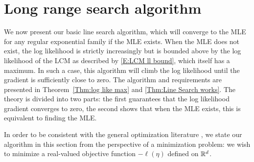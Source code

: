 \section{Long range search algorithm} \label{S:Algorithm}
We now present our basic line search algorithm, which will converge to the MLE for any 
regular exponential family if the MLE exists.  When the MLE does not exist, the log
likelihood is strictly increasingly but is bounded above by the log likelihood of the LCM
as described by \eqref{E:LCM ll bound}, which itself has a maximum.  In such a case,
this algorithm will climb the log likelihood until the gradient is sufficiently close to zero.
The algorithm and requirements are presented in Theorem~\ref{Thm:log like max} and \ref{Thm:Line Search works}.  The theory is divided into two parts: the first
guarantees that the log likelihood gradient converges to zero, the second shows that when the MLE exists, this is equivalent to finding the MLE.  

In order to be consistent with the general optimization literature \citep{Fletcher,NW}, 
we state our algorithm in this 
section from the perspective of a minimization problem: we wish to minimize a 
real-valued objective function $-\ell(\eta)$ 
defined on ${\mathbb R}^d$.  

